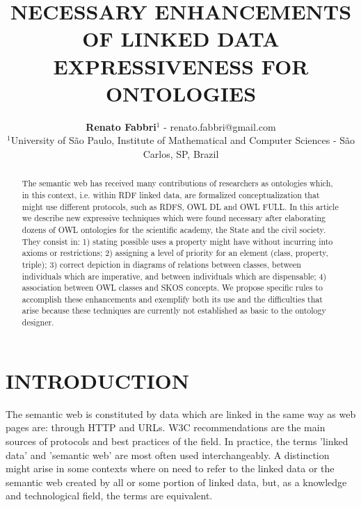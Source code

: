 \documentclass[12pt,fleqn]{article}
\title{NECESSARY ENHANCEMENTS OF LINKED DATA EXPRESSIVENESS FOR ONTOLOGIES}
\author
    {\rm \begin{tabular}{l} 
    \textbf{Renato Fabbri}$^{1}$ - {\textnormal renato.fabbri@gmail.com}\\%
    {\fontsize{11}{0}\selectfont $^{1}$University of São Paulo, Institute of Mathematical and Computer Sciences - São Carlos, SP, Brazil}\vspace*{-0.05cm} \\
  \end{tabular}}
\renewcommand{\headrulewidth}{0.0pt}
\begin{document}
\maketitle

\thispagestyle{firspagetstyle}

\renewcommand{\headrulewidth}{0.0pt}
\rhead{}

\begin{abstract}
	The semantic web has received many contributions of researchers as ontologies which,
	in this context, i.e. within RDF linked data, are formalized conceptualization that might use
	different protocols, such as RDFS, OWL DL and OWL FULL.
	In this article we describe new expressive techniques which were found necessary after
	elaborating dozens of OWL ontologies for the scientific academy, the State and the civil society.
	They consist in: 1) stating possible uses a property might have without incurring into axioms or restrictions;
	2) assigning a level of priority for an element (class, property, triple); 3) correct depiction in diagrams
	of relations between classes, between individuals which are imperative, and between individuals which are dispensable;
	4) association between OWL classes and SKOS concepts.
	We propose specific rules to accomplish these enhancements and exemplify both its use
	and the difficulties that arise because these techniques are currently not established as basic to the ontology designer.  
\end{abstract}


\pagestyle{fancy}

\section{INTRODUCTION}
The semantic web is constituted by data which are linked in the same way
as web pages are: through HTTP and URLs.
W3C recommendations are the main sources of protocols and best practices of the field.
In practice, the terms 'linked data' and 'semantic web' are most often used interchangeably.
A distinction might arise in some contexts where on need to refer to the linked data or
the semantic web created by all or some portion of linked data, but, as a knowledge and technological
field, the terms are equivalent.
\end{document}
